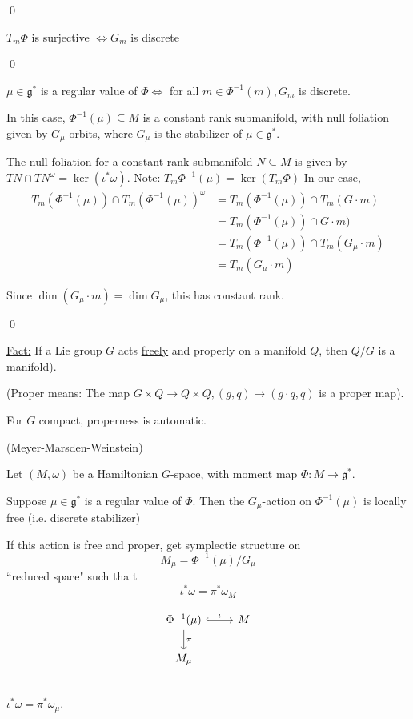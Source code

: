 \documentclass[x11names,reqno,14pt]{extarticle}
\newcommand{\mk}[1]{\mathfrak{#1}}
\newcommand{\g}{\mk{g}}
\begin{document}
\qed

\cor

$T_m\Phi$ is surjective $\iff G_m$ is discrete

\proof

\qed

\thm

$\mu\in\g^*$ is a regular value of $\Phi \iff $ for all $m \in \Phi^{-1}(m), G_m$ is discrete. 

In this case, $\Phi^{-1}(\mu) \subseteq M$ is a constant rank submanifold, with null foliation given by $G_{\mu}$-orbits, where $G_\mu$ is the stabilizer of $\mu\in\g^*$.

\proof

The null foliation for a constant rank submanifold $N \subseteq M$ is given by $TN \cap TN^\omega = \ker(\iota^*\omega)$.
Note: $T_m\Phi^{-1}(\mu) = \ker(T_m\Phi)$
In our case, 
\begin{align*}
T_m(\Phi^{-1}(\mu))\cap T_m(\Phi^{-1}(\mu))^\omega & = T_m(\Phi^{-1}(\mu))\cap T_m(G\cdot m) \\
& = T_m(\Phi^{-1}(\mu))\cap G\cdot m) \\
& = T_m(\Phi^{-1}(\mu))\cap T_m(G_\mu\cdot m) \\
& = T_m(G_\mu\cdot m)
\end{align*}

Since $\dim (G_\mu\cdot m) = \dim G_\mu$, this has constant rank.

\qed

\underline{Fact:} If a Lie group $G$ acts \underline{freely} and {properly} on a manifold $Q$, then $Q/G$ is a manifold). 

(Proper means: The map $G\times Q \to Q\times Q, (g,q)\mapsto(g\cdot q, q)$ is a proper map).

For $G$ compact, properness is automatic. 

\thm(Meyer-Marsden-Weinstein)

Let $(M,\omega)$ be a Hamiltonian $G$-space, with moment map $\Phi:M\to\g^*$. 

Suppose $\mu\in\g^*$ is a regular value of $\Phi$. Then the $G_\mu$-action on $\Phi^{-1}(\mu)$ is locally free (i.e. discrete stabilizer)

If this action is free and proper, get symplectic structure on 
\[
M_\mu = \Phi^{-1}(\mu)/G_\mu
\]
``reduced space" such tha t
\[
\iota^*\omega = \pi^*\omega_M
\]

\[
\begin{tikzcd}
\Phi^{-1}(\mu) \ar[d, "\pi"] \ar[r, hook, "\iota"] & M \\
M_\mu & \\
\end{tikzcd}
\]
$\iota^*\omega = \pi^*\omega_\mu$. 
\end{document}
